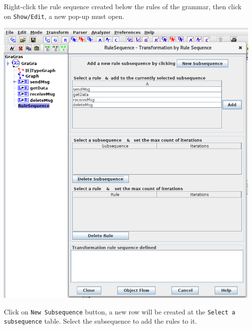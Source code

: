\documentclass[12pt]{article}
\newenvironment{tutorialstep}
	{\hspace{-\parindent}\begin{minipage}{\textwidth}}
    {\vspace{.3cm}\end{minipage}}
\begin{document}
\begin{tutorialstep}
  Right-click the rule sequence created below the rules of the grammar, then click on \texttt{Show/Edit}, a new pop-up must open.\\

  \begin{center}
  \noindent
  \centering
  \includegraphics[scale = 0.5]{img/concurrent-rules/rule-sequence_02.png}\\
  \end{center}
  
  Click on \texttt{New Subsequence} button, a new row will be created at the \texttt{Select a subsequence} table. Select the subsequence to add the rules to it.
\end{tutorialstep}
\end{document}
